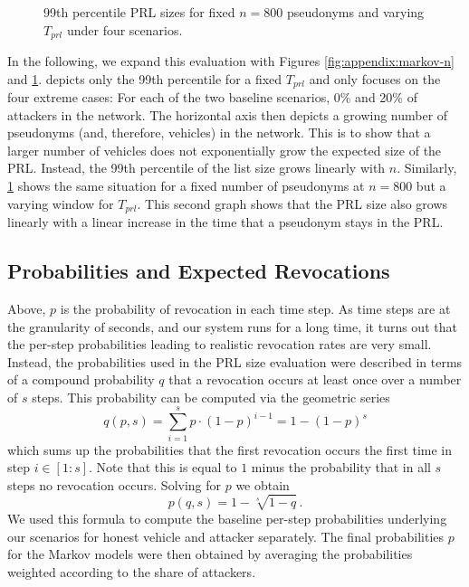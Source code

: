 \begin{figure}[t]
    \centering
    \resizebox{.83\linewidth}{!}{} 
    \caption[99th percentile PRL sizes for fixed $n=800$ and varying $T_{prl}$]{99th percentile PRL sizes for fixed $n=800$ pseudonyms and varying $T_{prl}$ under four scenarios.}
    \label{fig:appendix:markov-e}  
\end{figure}

In the following, we expand this evaluation with Figures
\ref{fig:appendix:markov-n} and \ref{fig:appendix:markov-e}.
 depicts only the 99th percentile for a fixed
$T_{prl}$ and only focuses on the four extreme cases: For each of the two
baseline scenarios, 0\% and 20\% of attackers in the network. The horizontal
axis then depicts a growing number of pseudonyms (and, therefore, vehicles) in
the network. This is to show that a larger number of vehicles does not
exponentially grow the expected size of the \ac{PRL}. Instead, the 99th
percentile of the list size grows linearly with $n$. Similarly,
\cref{fig:appendix:markov-e} shows the same situation for a fixed number of
pseudonyms at $n=800$ but a varying window for $T_{prl}$. This second graph
shows that the \ac{PRL} size also grows linearly with a linear increase in the
time that a pseudonym stays in the \ac{PRL}.

\subsection{Probabilities and Expected Revocations}

Above, $p$ is the probability of revocation in each time step. As time steps are at the granularity of seconds, and our system runs for a long time, it turns out that the per-step probabilities leading to realistic revocation rates are very small. Instead, the probabilities used in the \ac{PRL} size evaluation were described in terms of a compound probability $q$ that a revocation occurs at least once over a number of $s$ steps. This probability can be computed via the geometric series
\[q(p,s) = \sum_{i=1}^s p\cdot(1-p)^{i-1} = 1-(1-p)^s\] 
which sums up the probabilities that the first revocation occurs the first time in step $i\in[1:s]$. Note that this is equal to $1$ minus the probability that in all $s$ steps no revocation occurs. Solving for $p$ we obtain
\[p(q,s) = 1-\sqrt[s]{1-q}\,.\]
We used this formula to compute the baseline per-step probabilities underlying our scenarios for honest vehicle and attacker separately. The final probabilities $p$ for the Markov models were then obtained by averaging the probabilities weighted according to the share of attackers.

